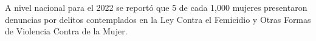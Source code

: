 A nivel nacional para el 2022 se reportó que 5 de cada 1,000 mujeres presentaron denuncias por delitos contemplados en la Ley Contra el Femicidio y Otras Formas de Violencia Contra de la Mujer.